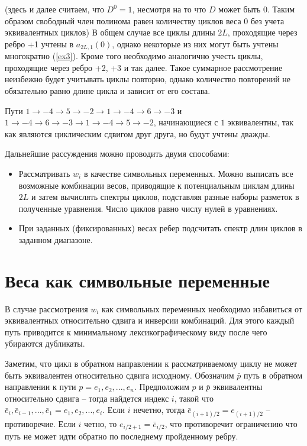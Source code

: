 \documentclass[specification,annotation,times]{itmo-student-thesis}
\begin{document}
(здесь и далее считаем, что $D^0=1$, несмотря на то что $D$ может быть $0$. Таким образом
свободный член полинома равен количеству циклов веса $0$ без учета эквивалентных циклов)
В общем случае все циклы длины $2L$, проходящие через ребро +1 учтены в $a_{2L,1}(0)$, однако
некоторые из них могут быть учтены многократно (\ref{ex3}). Кроме того необходимо аналогично учесть
циклы, проходящие через ребро +2, +3 и так далее. Такое суммарное рассмотрение неизбежно
будет учитывать циклы повторно, однако количество повторений не обязательно равно длине цикла и
зависит от его состава.
\begin{example} \label{ex3}

 Пути $1 \to -4 \to 5 \to -2 \to 1 \to -4 \to 6 \to -3$ и $1 \to -4 \to 6 \to -3 \to 1 \to -4 \to 5 \to -2$,
начинающиеся с $1$ эквивалентны, так как являются циклическим сдвигом друг друга, но будут учтены дважды. 
\end{example}

Дальнейшие рассуждения можно проводить двумя способами:
\begin{itemize}
  \item
  Рассматривать $w_i$ в качестве символьных переменных. 
Можно выписать все возможные комбинации весов, приводящие к потенциальным 
циклам длины $2L$ и затем вычислять спектры циклов, подставляя разные 
наборы разметок в полученные уравнения. Число циклов равно числу нулей в уравнениях.  
\item
  При заданных (фиксированных) весах ребер подсчитать спектр длин циклов в заданном диапазоне.
\end{itemize}

\section{Веса как символьные переменные}
В случае рассмотрения $w_i$ как символьных переменных необходимо избавиться от эквивалентных
относительно сдвига и инверсии комбинаций. Для этого каждый путь приводится к минимальному 
лексикографическому виду после чего убираются дубликаты. 

Заметим, что цикл в обратном направлении
к рассматриваемому циклу не может быть эквивалентен относительно сдвига исходному.
Обозначим $\bar{p}$ путь в обратном направлении к пути $p=e_1,e_2,...,e_n$. 
Предположим $p$ и $\bar{p}$ эквивалентны относительно сдвига -- тогда найдется индекс $i$, такой что
$\bar{e}_i, \bar{e}_{i-1}, ..., \bar{e}_1 = e_1, e_2, ..., e_i$.  Если $i$ нечетно, тогда $\bar{e}_{(i + 1)/2} = e_{(i+1)/2}$ -- противоречие.
 Если $i$ четно, то $e_{i/2 + 1}=\bar{e}_{i/2}$, что противоречит ограничению что путь не может
идти обратно по последнему пройденному ребру.
\end{document}
